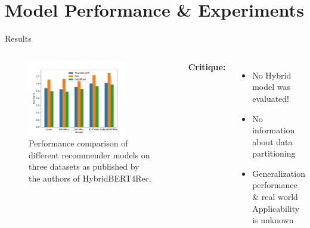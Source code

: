 \documentclass[en]{sdqbeamer}
\begin{document}
\section{Model Performance \& Experiments}
\begin{frame}{Results}
	\begin{columns}
		\begin{figure}
			\includegraphics[height=0.55\textheight, width=0.8\textwidth]{images/results.pdf}
			\caption{Performance comparison of different recommender models on three datasets as published by the authors of HybridBERT4Rec. \cite{channarongHybridBERT4RecHybridContentBased2022}}
		\end{figure}
		\textbf{Critique:}
		\begin{itemize} \pause
			\item No Hybrid model was evaluated!
			\item No information about data partitioning
			\item Generalization performance \& real world Applicability is unknown
		\end{itemize}
	\end{columns}
\end{frame}
\end{document}
